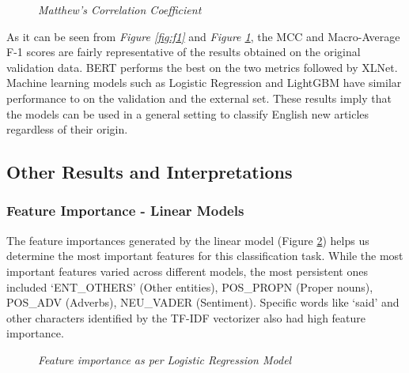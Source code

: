 \documentclass[11pt]{article}
\begin{document}
\begin{figure}[!htb]
\caption{\label{fig:mcc}  \textit{Matthew's Correlation Coefficient}}
\end{figure}

As it can be seen from \textit{Figure \ref{fig:f1}} and \textit{Figure \ref{fig:mcc}}, the MCC and Macro-Average F-1 scores are fairly representative of the results obtained on the original validation data. BERT performs the best on the two metrics followed by XLNet. Machine learning models such as Logistic Regression and LightGBM have similar performance to on the validation and the external set. These results imply that the models can be used in a general setting to classify English new articles regardless of their origin.




\subsection{Other Results and Interpretations}


\subsubsection{Feature Importance - Linear Models}

The feature importances generated by the linear model (Figure \ref{fig:fi}) helps us determine the most important features for this classification task. While the most important features varied across different models, the most persistent ones included ‘ENT\_OTHERS’ (Other entities), POS\_PROPN (Proper nouns), POS\_ADV (Adverbs), NEU\_VADER (Sentiment). Specific words like ‘said’ and other characters identified by the TF-IDF vectorizer also had high feature importance.

\begin{figure}[!htb]
\caption{\label{fig:fi}  \textit{Feature importance as per Logistic Regression Model}}
\end{figure}
\end{document}
